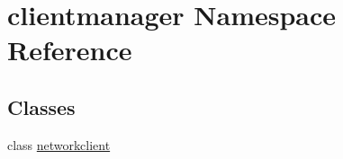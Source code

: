 \hypertarget{namespaceclientmanager}{}\section{clientmanager Namespace Reference}
\label{namespaceclientmanager}
\subsection*{Classes}
\begin{DoxyCompactItemize}
\item 
class \hyperlink{classclientmanager_1_1networkclient}{networkclient}
\end{DoxyCompactItemize}

